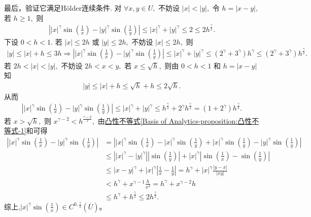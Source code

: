 \documentclass[../../main.tex]{subfiles}
\begin{document}
\begin{examples}
最后，验证它满足H\"older连续条件.
对 $\forall x,y\in U,$ 不妨设 $|x|<|y|,$ 令 $h=|x-y|,$ 若 $h\geqslant 1,$ 则
\begin{align*}
\left| |x|^{\gamma}\sin \left( \frac{1}{x} \right) -|y|^{\gamma}\sin \left( \frac{1}{y} \right) \right|\leqslant |x|^{\gamma}+|y|^{\gamma}\leqslant 2\leqslant 2h^{\frac{\gamma}{2}}.
\end{align*}
下设 $0<h<1.$ 若 $|x|\leqslant 2h$ 或 $|y|\leqslant 2h,$ 不妨设 $|x|\leqslant 2h,$ 则
\begin{align*}
|y|\leqslant |x|+h\leqslant 3h\Longrightarrow \left| |x|^{\gamma}\sin \left( \frac{1}{x} \right) -|y|^{\gamma}\sin \left( \frac{1}{y} \right) \right|\leqslant |x|^{\gamma}+|y|^{\gamma}\leqslant \left( 2^{\gamma}+3^{\gamma} \right) h^{\gamma}\leqslant  \left( 2^{\gamma}+3^{\gamma} \right) h^{\frac{\gamma}{2}}.
\end{align*}
若 $2h<|x|<|y|,$ 不妨设 $2h<x<y,$ 若 $x\leqslant \sqrt{h},$ 则由 $0<h<1$ 和 $h=|x-y|$ 知
\begin{align*}
|y|\leqslant |x|+h\leqslant \sqrt{h}+h\leqslant 2\sqrt{h}.
\end{align*}
从而
\begin{align*}
\left| |x|^{\gamma}\sin \left( \frac{1}{x} \right) -|y|^{\gamma}\sin \left( \frac{1}{y} \right) \right|\leqslant |x|^{\gamma}+|y|^{\gamma}\leqslant h^{\frac{\gamma}{2}}+2^{\gamma}h^{\frac{\gamma}{2}}= \left( 1+2^{\gamma} \right) h^{\frac{\gamma}{2}}.
\end{align*}
若 $x>\sqrt{h},$ 则 $x^{\gamma -2}<h^{\frac{\gamma -2}{2}},$ 由\hyperref[Basis of Analytics-proposition:凸性不等式]{凸性不等式\ref{Basis of Analytics-proposition:凸性不等式-1}}和可得
\begin{align*}
\left| |x|^{\gamma}\sin \left( \frac{1}{x} \right) -|y|^{\gamma}\sin \left( \frac{1}{y} \right) \right| &=\left| |x|^{\gamma}\sin \left( \frac{1}{x} \right) -|x|^{\gamma}\sin \left( \frac{1}{y} \right) +|x|^{\gamma}\sin \left( \frac{1}{y} \right) -|y|^{\gamma}\sin \left( \frac{1}{y} \right) \right| \\
&\leqslant \left| |x|^{\gamma}-|y|^{\gamma} \right|\left| \sin \left( \frac{1}{y} \right) \right|+|x|^{\gamma}\left| \sin \left( \frac{1}{x} \right) -\sin \left( \frac{1}{y} \right) \right| \\
&\leqslant |x-y|^{\gamma}+|x|^{\gamma}\left| \frac{1}{x}-\frac{1}{y} \right|=h^{\gamma}+|x|^{\gamma}\frac{|y-x|}{|xy|} \\
&<h^{\gamma}+x^{\gamma -1}\frac{h}{x^2}=h^{\gamma}+x^{\gamma -2}h \\
&\leqslant h^{\gamma}+h^{\frac{\gamma}{2}}\leqslant 2h^{\frac{\gamma}{2}}.
\end{align*}
综上,$|x|^{\gamma}\sin \left( \frac{1}{x} \right)\in C^{0,\frac{\gamma}{2}}(\overline{U})$。
\end{examples}
\end{document}
